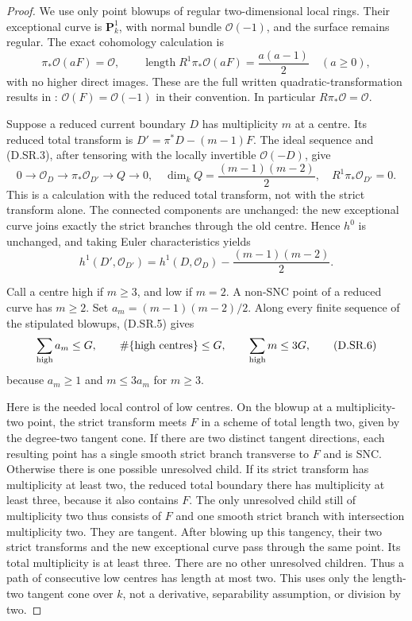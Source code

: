 \begin{proof}
We use only point blowups of regular two-dimensional local rings.
Their exceptional curve is $\mathbf P^1_k$, with normal bundle
$\mathcal O(-1)$, and the surface remains regular. The exact
cohomology calculation is
\[
 \pi_*\mathcal O(aF)=\mathcal O,
 \qquad
 \operatorname{length}R^1\pi_*\mathcal O(aF)
       =\frac{a(a-1)}2\quad(a\ge0),                    \tag{D.SR.3}
\]
with no higher direct images. These are the full written
quadratic-transformation results in
\citet[Lemmas 54.3.1, 54.3.2 and 54.3.4,
Tags 0AGQ, 0AGR and 0AGS]{StacksSNCRefinementRoot}:
$\mathcal O(F)=\mathcal O(-1)$ in their convention.
In particular $R\pi_*\mathcal O=\mathcal O$.

Suppose a reduced current boundary $D$ has multiplicity $m$
at a centre. Its reduced total transform is
$D'=\pi^*D-(m-1)F$. The ideal sequence and (D.SR.3),
after tensoring with the locally invertible $\mathcal O(-D)$,
give
\[
 0\longrightarrow\mathcal O_D
  \longrightarrow\pi_*\mathcal O_{D'}
  \longrightarrow Q\longrightarrow0,
 \quad \dim_k Q=\frac{(m-1)(m-2)}2,
 \quad R^1\pi_*\mathcal O_{D'}=0.                      \tag{D.SR.4}
\]
This is a calculation with the reduced total transform, not
with the strict transform alone. The connected components are
unchanged: the new exceptional curve joins exactly the strict
branches through the old centre. Hence $h^0$ is unchanged,
and taking Euler characteristics yields
\[
 h^1(D',\mathcal O_{D'})
   =h^1(D,\mathcal O_D)-\frac{(m-1)(m-2)}2.            \tag{D.SR.5}
\]

Call a centre high if $m\ge3$, and low if $m=2$.
A non-SNC point of a reduced curve has $m\ge2$.
Set $a_m=(m-1)(m-2)/2$. Along every finite sequence
of the stipulated blowups, (D.SR.5) gives
\[
 \sum_{\rm high}a_m\le G,
 \qquad \#\{\text{high centres}\}\le G,
 \qquad \sum_{\rm high}m\le3G,                        \tag{D.SR.6}
\]
because $a_m\ge1$ and $m\le3a_m$ for $m\ge3$.

Here is the needed local control of low centres. On the
blowup at a multiplicity-two point, the strict transform
meets $F$ in a scheme of total length two, given by the
degree-two tangent cone. If there are two distinct tangent
directions, each resulting point has a single smooth strict
branch transverse to $F$ and is SNC. Otherwise there is
one possible unresolved child. If its strict transform has
multiplicity at least two, the reduced total boundary there
has multiplicity at least three, because it also contains $F$.
The only unresolved child still of multiplicity two thus
consists of $F$ and one smooth strict branch with intersection
multiplicity two. They are tangent. After blowing up this
tangency, their two strict transforms and the new exceptional
curve pass through the same point. Its total multiplicity is
at least three. There are no other unresolved children.
Thus a path of consecutive low centres has length at most two.
This uses only the length-two tangent cone over $k$, not a
derivative, separability assumption, or division by two.


\end{proof}
